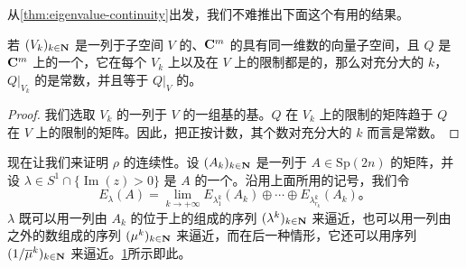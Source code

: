 从\cref{thm:eigenvalue-continuity}出发，我们不难推出下面这个有用的结果。

\begin{proposition}\label{thm:signature-continuity}
若 $(V_k)_{k\in\mathbf{N}}$ 是一列\trConvergence{}于子空间 $V$ 的、$\mathbf{C}^m$ 的具有同一维数的向量子空间，且 $Q$ 是 $\mathbf{C}^m$ 上的一个\trQuadraticForm，它在每个 $V_k$ 上以及在 $V$ 上的限制都是\trNondegenerate{}的，那么对充分大的 $k$，$Q|_{V_k}$ 的\trSignature{}是常数，并且等于 $Q|_V$ 的\trSignature。
\end{proposition}

\begin{proof}
我们选取 $V_k$ 的一列\trConvergence{}于 $V$ 的一组\trUnitary{}基的\trUnitary{}基。$Q$ 在 $V_k$ 上的限制的矩阵趋于 $Q$ 在 $V$ 上的限制的矩阵。因此，把正\trEigenvalue{}按\trMultiplicity{}计数，其个数对充分大的 $k$ 而言是常数。
\end{proof}

现在让我们来证明 $\rho$ 的连续性。设 $(A_k)_{k\in\mathbf{N}}$ 是一列\trConvergence{}于 $A\in\mathrm{Sp}(2n)$ 的\trSymplectic{}矩阵，并设 $\lambda\in S^1\cap\{\operatorname{Im}(z)>0\}$ 是 $A$ 的一个\trEigenvalue。沿用上面所用的记号，我们令
\[
E_\lambda(A)=\lim_{k\to+\infty}E_{\lambda^k_1}(A_k)\oplus\dotsb\oplus E_{\lambda^k_{r_k}}(A_k)\text{。}
\]
\trEigenvalue{} $\lambda$ 既可以用一列由 $A_k$ 的位于\trCircle{}上的\trEigenvalue{}组成的序列 $(\lambda^k)_{k\in\mathbf{N}}$ 来逼近，也可以用一列由\trCircle{}之外的数组成的序列 $(\mu^k)_{k\in\mathbf{N}}$ 来逼近，而在后一种情形，它还可以用序列 $(1/\overline{\mu}^k)_{k\in\mathbf{N}}$ 来逼近。\cref{fig:rho-circle-approx}所示即此。

\begin{figure}[htbp]
\centering
{}
\caption{}
\label{fig:rho-circle-approx}
\end{figure}

